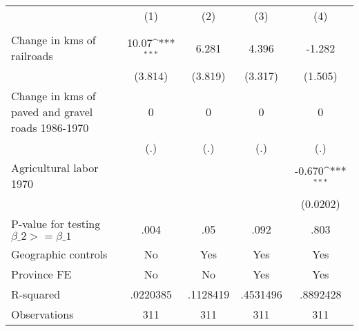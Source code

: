 {
\def\sym#1{\ifmmode^{#1}\else\(^{#1}\)\fi}
\begin{tabular}{l*{4}{c}}
\hline\hline
                &\multicolumn{1}{c}{(1)}&\multicolumn{1}{c}{(2)}&\multicolumn{1}{c}{(3)}&\multicolumn{1}{c}{(4)}\\
                &\multicolumn{1}{c}{}&\multicolumn{1}{c}{}&\multicolumn{1}{c}{}&\multicolumn{1}{c}{}\\
\hline
Change in kms of railroads&    10.07\sym{***}&    6.281         &    4.396         &   -1.282         \\
                &  (3.814)         &  (3.819)         &  (3.317)         &  (1.505)         \\
[1em]
Change in kms of paved and gravel roads 1986-1970&        0         &        0         &        0         &        0         \\
                &      (.)         &      (.)         &      (.)         &      (.)         \\
[1em]
Agricultural labor 1970&                  &                  &                  &   -0.670\sym{***}\\
                &                  &                  &                  & (0.0202)         \\
\hline
P-value for testing $\beta\_{2} >= \beta\_{1}$&     .004         &      .05         &     .092         &     .803         \\
Geographic controls&       No         &      Yes         &      Yes         &      Yes         \\
Province FE     &       No         &       No         &      Yes         &      Yes         \\
R-squared       & .0220385         & .1128419         & .4531496         & .8892428         \\
Observations    &      311         &      311         &      311         &      311         \\
\hline\hline
\end{tabular}
}
